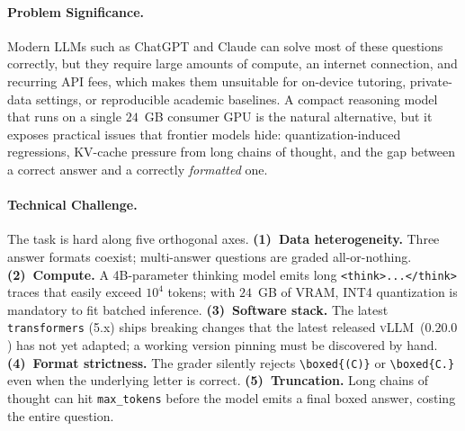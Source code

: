 \documentclass{article}
\begin{document}
\paragraph{Problem Significance.}
Modern LLMs such as ChatGPT and Claude can solve most of these
questions correctly, but they require large amounts of compute, an
internet connection, and recurring API fees, which makes them
unsuitable for on-device tutoring, private-data settings, or
reproducible academic baselines. A compact reasoning model that runs
on a single $24$~GB consumer GPU is the natural alternative, but it
exposes practical issues that frontier models hide: quantization-induced
regressions, KV-cache pressure from long chains of thought, and the
gap between a correct answer and a correctly \emph{formatted} one.

\paragraph{Technical Challenge.}
The task is hard along five orthogonal axes.
\textbf{(1)~Data heterogeneity.} Three answer formats coexist; multi-answer
questions are graded all-or-nothing.
\textbf{(2)~Compute.} A 4B-parameter thinking model emits long
\verb|<think>...</think>| traces that easily exceed $10^4$ tokens; with
$24$~GB of VRAM, INT4 quantization is mandatory to fit batched
inference.
\textbf{(3)~Software stack.} The latest \texttt{transformers} (5.x)
ships breaking changes that the latest released
\textsc{vLLM}~($0.20.0$) has not yet adapted; a working version pinning
must be discovered by hand.
\textbf{(4)~Format strictness.} The grader silently rejects
\verb|\boxed{(C)}| or \verb|\boxed{C.}| even when the underlying
letter is correct.
\textbf{(5)~Truncation.} Long chains of thought can hit
\texttt{max\_tokens} before the model emits a final boxed answer,
costing the entire question.
\end{document}
